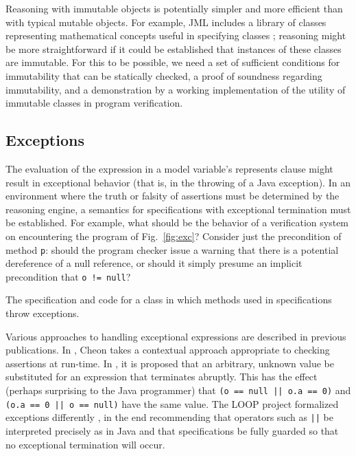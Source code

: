\documentclass{sig-alternate}
\begin{document}
Reasoning with immutable objects is potentially simpler and more efficient than with typical
mutable objects.  For example, JML includes a library of classes representing mathematical 
concepts useful in specifying classes \cite{Leavens-etal03a}; 
reasoning might be more straightforward if it could be 
established that instances of these classes are immutable.  For this to be possible, we need 
a set of sufficient conditions for immutability that can be statically checked, a proof of 
soundness regarding immutability, and a demonstration by a working implementation
of the utility of immutable classes in program verification.


\subsection{Exceptions}

The evaluation of the expression in a model variable's represents clause might result in
exceptional behavior (that is, in the throwing of a Java exception).  In an environment
where the truth or falsity of assertions must be determined by the reasoning engine, a
semantics for specifications with exceptional termination must be established.  For example,
what should be the behavior of a verification system on encountering the program of 
Fig.~\ref{fig:exc}?  Consider just the precondition of method \texttt{p}: should the program 
checker issue a warning that there is a potential dereference of a null reference, or should it
simply presume an implicit precondition that \texttt{o != null}?

\begin{BFIGURE}

\caption{The specification and code for a class in which methods used in specifications throw exceptions.}
\label{fig:exc}
\end{BFIGURE}

Various approaches to handling exceptional expressions are described in previous 
publications.
In \cite{Cheon-Leavens02b}, Cheon takes a contextual approach appropriate to checking
assertions at run-time.   In \cite{Leavens-Baker-Ruby02}, it is proposed that 
an arbitrary, unknown value be substituted for an expression that terminates abruptly.
This has the effect (perhaps surprising to the Java programmer) that
\texttt{(o == null || o.a == 0)} and \texttt{(o.a == 0 || o == null)} have the same value.
The LOOP project formalized exceptions differently \cite{BergPJ00a}, in the end recommending
that operators such as \texttt{||} be interpreted precisely as in Java and that specifications be
fully guarded so that no exceptional termination will occur.
\end{document}
